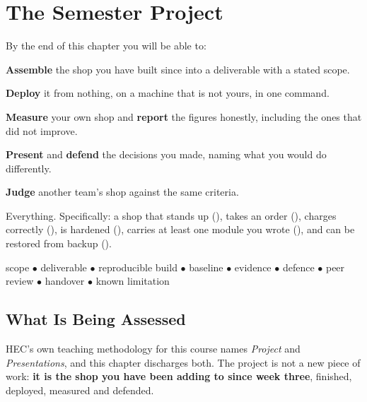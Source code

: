\chapter{The Semester Project}\label{ch:project}

\begin{outcomes}
By the end of this chapter you will be able to:
\begin{tight}
  \item \textbf{Assemble} the shop you have built since  into a
        deliverable with a stated scope.
  \item \textbf{Deploy} it from nothing, on a machine that is not yours, in one
        command.
  \item \textbf{Measure} your own shop and \textbf{report} the figures
        honestly, including the ones that did not improve.
  \item \textbf{Present} and \textbf{defend} the decisions you made, naming
        what you would do differently.
  \item \textbf{Judge} another team's shop against the same criteria.
\end{tight}
\end{outcomes}

\begin{prereq}
Everything. Specifically: a shop that stands up (), takes an order
(), charges correctly (), is hardened
(), carries at least one module you wrote (),
and can be restored from backup ().
\end{prereq}

\begin{keyterms}
scope $\bullet$ deliverable $\bullet$ reproducible build $\bullet$ baseline
$\bullet$ evidence $\bullet$ defence $\bullet$ peer review $\bullet$ handover
$\bullet$ known limitation
\end{keyterms}

\section{What Is Being Assessed}

HEC's own teaching methodology for this course names \emph{Project} and
\emph{Presentations}, and this chapter discharges both. The project is not a
new piece of work: \textbf{it is the shop you have been adding to since week
three}, finished, deployed, measured and defended.

